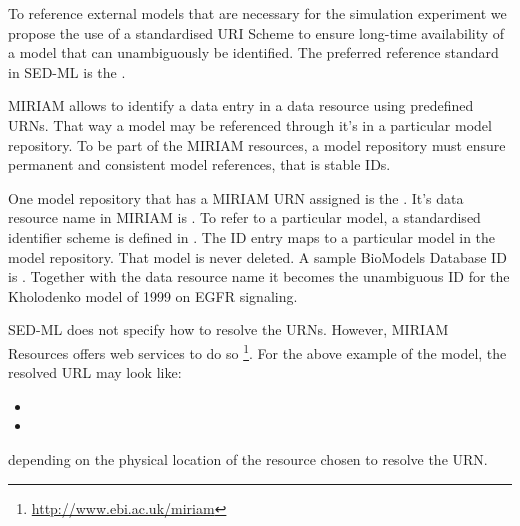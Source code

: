 \label{sec:uriScheme}
To reference external models that are necessary for the simulation experiment we propose the use of a standardised URI Scheme to ensure long-time availability  of a model that can unambiguously be identified. The preferred reference standard in SED-ML is the .

MIRIAM allows to identify a data entry in a data resource using predefined URNs. That way a  model may be referenced through it's  in a particular model repository. To be part of the MIRIAM resources, a model repository must ensure permanent and consistent model references, that is stable IDs.

One model repository that has a MIRIAM URN assigned is the . It's data resource name in MIRIAM is . To refer to a particular model, a standardised identifier scheme is defined in . The ID entry maps to a particular model in the model repository. That model is never deleted. 
A sample BioModels Database ID is . Together with the data resource name it becomes the unambiguous ID  for the Kholodenko model of 1999 on EGFR signaling. 
%

SED-ML does not specify how to resolve the URNs. However, MIRIAM Resources offers web services to do so \footnote{\url{http://www.ebi.ac.uk/miriam}}. For the above example of the  model, the resolved URL may look like: 
\begin{itemize}
 \item{}
 \item{}
\end{itemize}
depending on the physical location of the resource chosen to resolve the URN.

